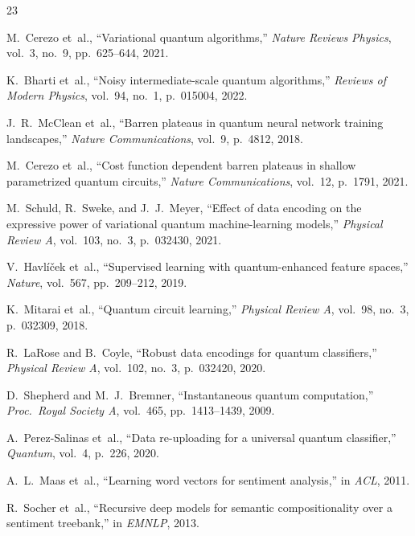 \documentclass[conference,onecolumn,11pt]{IEEEtran}
\begin{document}
\begin{thebibliography}{23}

M.~Cerezo et~al., ``Variational quantum algorithms,'' \emph{Nature Reviews Physics}, vol.~3, no.~9, pp.~625--644, 2021.

K.~Bharti et~al., ``Noisy intermediate-scale quantum algorithms,'' \emph{Reviews of Modern Physics}, vol.~94, no.~1, p.~015004, 2022.

J.~R.~McClean et~al., ``Barren plateaus in quantum neural network training landscapes,'' \emph{Nature Communications}, vol.~9, p.~4812, 2018.

M.~Cerezo et~al., ``Cost function dependent barren plateaus in shallow parametrized quantum circuits,'' \emph{Nature Communications}, vol.~12, p.~1791, 2021.

M.~Schuld, R.~Sweke, and J.~J.~Meyer, ``Effect of data encoding on the expressive power of variational quantum machine-learning models,'' \emph{Physical Review A}, vol.~103, no.~3, p.~032430, 2021.

V.~Havl\'{i}\v{c}ek et~al., ``Supervised learning with quantum-enhanced feature spaces,'' \emph{Nature}, vol.~567, pp.~209--212, 2019.

K.~Mitarai et~al., ``Quantum circuit learning,'' \emph{Physical Review A}, vol.~98, no.~3, p.~032309, 2018.

R.~LaRose and B.~Coyle, ``Robust data encodings for quantum classifiers,'' \emph{Physical Review A}, vol.~102, no.~3, p.~032420, 2020.

D.~Shepherd and M.~J.~Bremner, ``Instantaneous quantum computation,'' \emph{Proc.\ Royal Society A}, vol.~465, pp.~1413--1439, 2009.

A.~Perez-Salinas et~al., ``Data re-uploading for a universal quantum classifier,'' \emph{Quantum}, vol.~4, p.~226, 2020.

A.~L.~Maas et~al., ``Learning word vectors for sentiment analysis,'' in \emph{ACL}, 2011.

R.~Socher et~al., ``Recursive deep models for semantic compositionality over a sentiment treebank,'' in \emph{EMNLP}, 2013.


\end{thebibliography}
\end{document}
